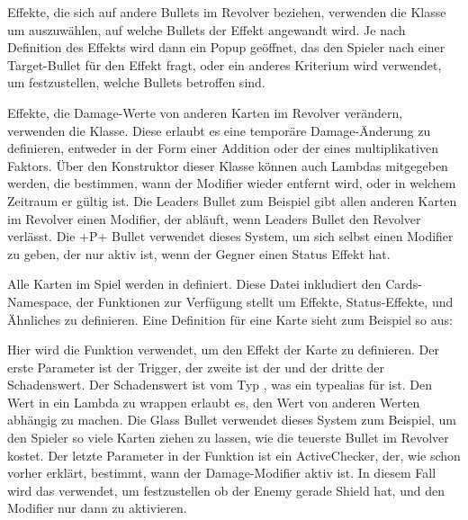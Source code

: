 Effekte, die sich auf andere Bullets im Revolver beziehen, verwenden die  Klasse um
auszuwählen, auf welche Bullets der Effekt angewandt wird.
Je nach Definition des Effekts wird dann ein Popup geöffnet, das den Spieler nach einer Target-Bullet für den Effekt
fragt, oder ein anderes Kriterium wird verwendet, um festzustellen, welche Bullets betroffen sind.

Effekte, die Damage-Werte von anderen Karten im Revolver verändern, verwenden die 
Klasse.
Diese erlaubt es eine temporäre Damage-Änderung zu definieren, entweder in der Form einer Addition oder der eines
multiplikativen Faktors.
Über den Konstruktor dieser Klasse können auch Lambdas mitgegeben werden, die bestimmen, wann der Modifier wieder
entfernt wird, oder in welchem Zeitraum er gültig ist.
Die Leaders Bullet zum Beispiel gibt allen anderen Karten im Revolver einen Modifier, der abläuft, wenn Leaders Bullet
den Revolver verlässt.
Die +P+ Bullet verwendet dieses System, um sich selbst einen Modifier zu geben, der nur aktiv ist, wenn der Gegner einen
Status Effekt hat.

Alle Karten im Spiel werden in  definiert.
Diese Datei inkludiert den Cards-Namespace, der Funktionen zur Verfügung stellt um Effekte, Status-Effekte, und
Ähnliches zu definieren.
Eine Definition für eine Karte sieht zum Beispiel so aus:


Hier wird die  Funktion verwendet, um den Effekt der Karte zu definieren.
Der erste Parameter ist der Trigger, der zweite ist der  und der dritte der Schadenswert.
Der Schadenswert ist vom Typ , was ein typealias für
 ist.
Den Wert in ein Lambda zu wrappen erlaubt es, den Wert von anderen Werten abhängig zu machen.
Die Glass Bullet verwendet dieses System zum Beispiel, um den Spieler so viele Karten ziehen zu lassen, wie die teuerste
Bullet im Revolver kostet.
Der letzte Parameter in der  Funktion ist ein ActiveChecker, der, wie schon vorher erklärt,
bestimmt, wann der Damage-Modifier aktiv ist.
In diesem Fall wird das   verwendet, um
festzustellen ob der Enemy gerade Shield hat, und den Modifier nur dann zu aktivieren.

\renewcommand{\kapitelautor}{}
